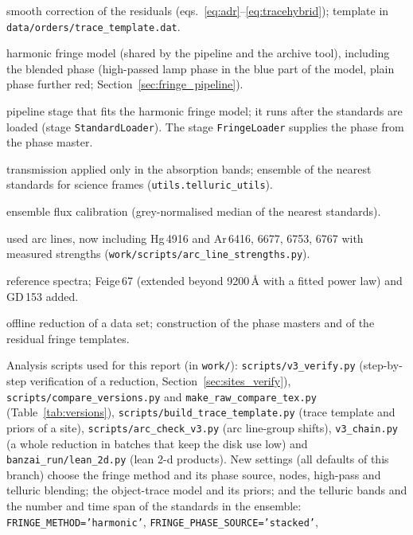 \begin{description}
smooth correction of the residuals (eqs.~\ref{eq:adr}--\ref{eq:tracehybrid}); template in
\texttt{data/orders/trace\_template.dat}.
\item[\texttt{utils.harmonic\_fringe\_utils}] harmonic fringe model (shared by the pipeline and the archive tool),
including the blended phase (high-passed lamp phase in the blue part of the model, plain phase further red;
Section~\ref{sec:fringe_pipeline}).
\item[\texttt{fringe.HarmonicFringeCorrector}] pipeline stage that fits the harmonic fringe model; it runs after the
standards are loaded (stage \texttt{StandardLoader}). The stage \texttt{FringeLoader} supplies the phase from the
phase master.
\item[\texttt{telluric}] transmission applied only in the absorption bands; ensemble of the nearest standards for
science frames (\texttt{utils.telluric\_utils}).
\item[\texttt{flux}, \texttt{utils.flux\_utils}] ensemble flux calibration (grey-normalised median of the nearest
standards).
\item[\texttt{arc\_lines}] used arc lines, now including Hg\,4916 and Ar\,6416, 6677, 6753, 6767 with measured
strengths (\texttt{work/scripts/arc\_line\_strengths.py}).
\item[\texttt{data/standards}] reference spectra; Feige\,67 (extended beyond 9200\,\AA{} with a fitted power law)
and GD\,153 added.
\item[\texttt{offline}, \texttt{fringe\_masters}] offline reduction of a data set; construction of the phase masters
and of the residual fringe templates.
\end{description}
Analysis scripts used for this report (in \texttt{work/}): \texttt{scripts/v3\_verify.py} (step-by-step verification
of a reduction, Section~\ref{sec:sites_verify}), \texttt{scripts/compare\_versions.py} and
\texttt{make\_raw\_compare\_tex.py} (Table~\ref{tab:versions}), \texttt{scripts/build\_trace\_template.py} (trace
template and priors of a site), \texttt{scripts/arc\_check\_v3.py} (arc line-group shifts),
\texttt{v3\_chain.py} (a whole reduction in batches that keep the disk use low) and \texttt{banzai\_run/lean\_2d.py}
(lean 2-d products).
New settings (all defaults of this branch) choose the fringe method and its phase source, nodes, high-pass and
telluric blending; the object-trace model and its priors; and the telluric bands and the number and time span of the
standards in the ensemble: \texttt{FRINGE\_METHOD='harmonic'}, \texttt{FRINGE\_PHASE\_SOURCE='stacked'},
